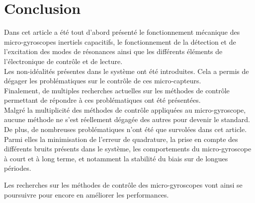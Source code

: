 \chapter*{Conclusion}%
\label{sec:conclusion}


Dans cet article a été tout d'abord présenté le fonctionnement mécanique des micro-gyroscopes inertiels capacitifs, le fonctionnement de la détection et de l'excitation des modes de résonances ainsi que les différents éléments de l'électronique de contrôle et de lecture.\\

Les non-idéalités présentes dans le système ont été introduites. Cela a permis de dégager les problématiques sur le contrôle de ces micro-capteurs.\\

Finalement, de multiples recherches actuelles sur les méthodes de contrôle permettant de répondre à ces problématiques ont été présentées.\\

Malgré la multiplicité des méthodes de contrôle appliquées au micro-gyroscope, aucune méthode ne s'est réellement dégagée des autres pour devenir le standard. De plus, de nombreuses problématiques n'ont été que survolées dans cet article. Parmi elles la minimisation de l'erreur de quadrature, la prise en compte des différents bruits présents dans le système, les comportements du micro-gyroscope à court et à long terme, et notamment la stabilité du biais sur de longues périodes.

Les recherches sur les méthodes de contrôle des micro-gyroscopes vont ainsi se poursuivre pour encore en améliorer les performances.

